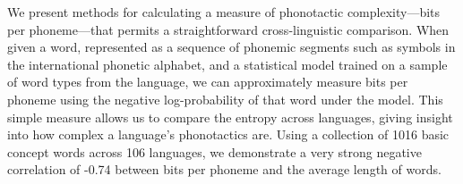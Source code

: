 We present methods for calculating a measure of phonotactic complexity---bits per phoneme---that permits a straightforward cross-linguistic comparison. When given a word, represented as a sequence of phonemic segments such as symbols in the international phonetic alphabet, and a statistical model trained on a sample of word types from the language, we can approximately measure bits per phoneme using the negative log-probability of that word under the model. This simple measure allows us to compare the entropy across languages, giving insight into how complex a language's phonotactics are. Using a collection of 1016 basic concept words across 106 languages, we demonstrate a very strong negative correlation of -0.74 between bits per phoneme and the average length of words.